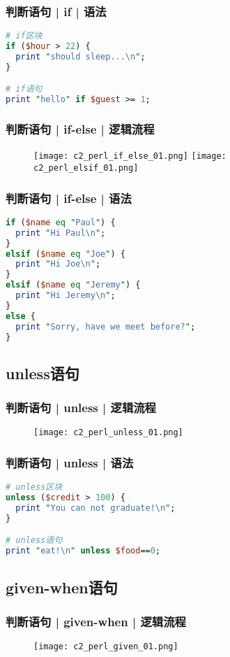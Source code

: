 \begin{frame}[fragile]
  \frametitle{判断语句 | if | \alert{语法}}
  \vspace{-1.5em}
\begin{lstlisting}[language=Perl]
# if区块
if ($hour > 22) {
  print "should sleep...\n";
}

# if语句
print "hello" if $guest >= 1;
\end{lstlisting}
\end{frame}

\begin{frame}
  \frametitle{判断语句 | if-else | 逻辑流程}
  \begin{figure}
    \centering
    \texttt{[image: c2\_perl\_if\_else\_01.png]}
    \texttt{[image: c2\_perl\_elsif\_01.png]}
  \end{figure}
\end{frame}

\begin{frame}[fragile]
  \frametitle{判断语句 | if-else | \alert{语法}}
  \vspace{-1.5em}
\begin{lstlisting}[language=Perl]
if ($name eq "Paul") {
  print "Hi Paul\n";
}
elsif ($name eq "Joe") {
  print "Hi Joe\n";
}
elsif ($name eq "Jeremy") {
  print "Hi Jeremy\n";
}
else {
  print "Sorry, have we meet before?";
}
\end{lstlisting}
\end{frame}

\subsection{unless语句}
\begin{frame}
  \frametitle{判断语句 | unless | 逻辑流程}
  \begin{figure}
    \centering
    \texttt{[image: c2\_perl\_unless\_01.png]}
  \end{figure}
\end{frame}

\begin{frame}[fragile]
  \frametitle{判断语句 | unless | \alert{语法}}
\begin{lstlisting}[language=Perl]
# unless区块
unless ($credit > 100) {
  print "You can not graduate!\n";
}

# unless语句
print "eat!\n" unless $food==0;
\end{lstlisting}
\end{frame}

\subsection{given-when语句}
\begin{frame}
  \frametitle{判断语句 | given-when | 逻辑流程}
  \begin{figure}
    \centering
    \texttt{[image: c2\_perl\_given\_01.png]}
  \end{figure}
\end{frame}

